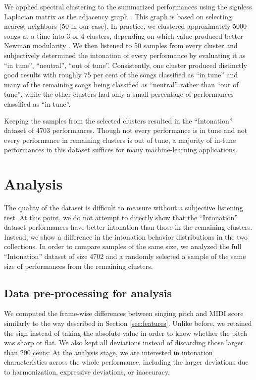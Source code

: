 \begin{appendices}
We applied spectral clustering to the summarized performances using the signless Laplacian matrix as the adjacency graph \cite{lucinska2012spectral}. This graph is based on selecting nearest neighbors (50 in our case). In practice, we clustered approximately 5000 songs at a time into 3 or 4 clusters, depending on which value produced better Newman modularity \cite{newman2006modularity}. We then listened to 50 samples from every cluster and subjectively determined the intonation of every performance by evaluating it as ``in tune'', ``neutral'', ``out of tune''. Consistently, one cluster produced distinctly good results with roughly 75 per cent of the songs classified as ``in tune'' and many of the remaining songs being classified as ``neutral'' rather than ``out of tune'', while the other clusters had only a small percentage of performances classified as ``in tune''. 

Keeping the samples from the selected clusters resulted in the ``Intonation'' dataset of 4703 performances. Though not every performance is in tune and not every performance in remaining clusters is out of tune, a majority of in-tune performances in this dataset suffices for many machine-learning applications.

\section{Analysis}

The quality of the dataset is difficult to measure without a subjective listening test. At this point, we do not attempt to directly show that the ``Intonation'' dataset performances have better intonation than those in the remaining clusters. Instead, we show a difference in the intonation behavior distributions in the two collections. In order to compare samples of the same size, we analyzed the full ``Intonation'' dataset of size 4702 and a randomly selected a sample of the same size of performances from the remaining clusters.

\subsection{Data pre-processing for analysis}
We computed the frame-wise differences between singing pitch and MIDI score similarly to the way described in Section \ref{sec:features}. Unlike before, we retained the sign instead of taking the absolute value in order to know whether the pitch was sharp or flat. We also kept all deviations instead of discarding those larger than 200 cents: At the analysis stage, we are interested in intonation characteristics across the whole performance, including the larger deviations due to harmonization, expressive deviations, or inaccuracy. 


\end{appendices}
